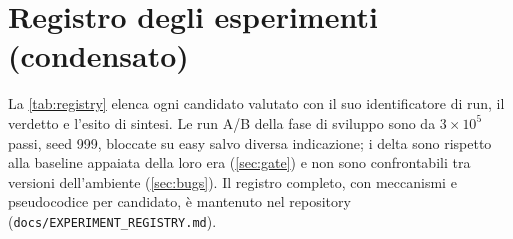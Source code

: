 
\chapter{Registro degli esperimenti (condensato)}
\label{app:registry}

La \cref{tab:registry} elenca ogni candidato valutato con il suo
identificatore di run, il verdetto e l'esito di sintesi. Le run A/B
della fase di sviluppo sono da $3\times10^{5}$ passi, seed 999,
bloccate su easy salvo diversa indicazione; i delta sono rispetto alla
baseline appaiata della loro era (\cref{sec:gate}) e non sono
confrontabili tra versioni dell'ambiente (\cref{sec:bugs}). Il registro
completo, con meccanismi e pseudocodice per candidato, è mantenuto nel
repository (\texttt{docs/EXPERIMENT\_REGISTRY.md}).

